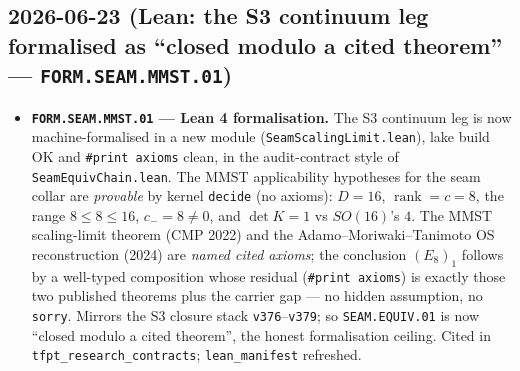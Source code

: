\subsection*{2026-06-23 (Lean: the S3 continuum leg formalised as ``closed modulo a cited theorem'' --- \texttt{FORM.SEAM.MMST.01})}
\begin{itemize}
\item \textbf{\texttt{FORM.SEAM.MMST.01} --- Lean 4 formalisation.} The S3 continuum leg is now
machine-formalised in a new module (\texttt{SeamScalingLimit.lean}), lake build OK and \texttt{\#print axioms}
clean, in the audit-contract style of \texttt{SeamEquivChain.lean}. The MMST applicability hypotheses for the seam collar
are \emph{provable} by kernel \texttt{decide} (no axioms): $D = 16$, $\operatorname{rank} = c = 8$, the range
$8 \le 8 \le 16$, $c_- = 8 \neq 0$, and $\det K = 1$ vs $SO(16)$'s $4$. The MMST scaling-limit theorem (CMP 2022) and
the Adamo--Moriwaki--Tanimoto OS reconstruction (2024) are \emph{named cited axioms}; the conclusion
$(E_8)_1$ follows by a well-typed composition whose residual (\texttt{\#print axioms}) is exactly those two
published theorems plus the carrier gap --- no hidden assumption, no \texttt{sorry}. Mirrors the S3 closure
stack \texttt{v376}--\texttt{v379}; so \texttt{SEAM.EQUIV.01} is now ``closed modulo a cited theorem'', the
honest formalisation ceiling. Cited in \texttt{tfpt\_research\_contracts}; \texttt{lean\_manifest} refreshed.
\end{itemize}

